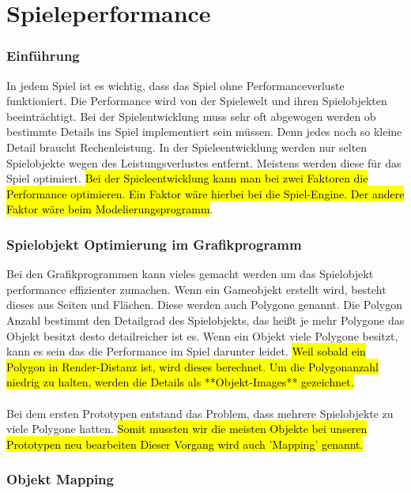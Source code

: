 
\pagebreak
{}
\chapter{Spieleperformance}


\subsection{Einführung}
In jedem Spiel ist es wichtig, dass das Spiel ohne Performanceverluste funktioniert. Die Performance wird von der Spielewelt und ihren Spielobjekten beeinträchtigt. Bei der Spielentwicklung muss sehr oft abgewogen werden ob bestimmte Details ins Spiel implementiert sein müssen. Denn jedes noch so kleine Detail braucht Rechenleistung. In der Spieleentwicklung werden nur selten Spielobjekte wegen des Leistungsverlustes entfernt. Meistens werden diese für das Spiel optimiert. \hl{Bei der Spieleentwicklung kann man bei zwei Faktoren die Performance optimieren. Ein Faktor wäre hierbei bei die Spiel-Engine. Der andere Faktor wäre beim Modelierungsprogramm}. %

\subsection{Spielobjekt Optimierung im Grafikprogramm}
Bei den Grafikprogrammen kann vieles gemacht werden um das Spielobjekt performance effizienter zumachen. Wenn ein Gameobjekt erstellt wird, besteht dieses aus Seiten und Flächen. Diese werden auch Polygone genannt. Die Polygon Anzahl bestimmt den Detailgrad des Spielobjekts, das heißt je mehr Polygone das Objekt besitzt desto detailreicher ist es. Wenn ein Objekt viele Polygone besitzt, kann es sein das die Performance im Spiel darunter leidet. \hl{Weil sobald ein Polygon in Render-Distanz ist, wird dieses berechnet. Um die Polygonanzahl niedrig zu halten, werden die Details als **Objekt-Images** gezeichnet.} \\\\ %
Bei dem ersten Prototypen entstand das Problem, dass mehrere Spielobjekte zu viele Polygone hatten. \hl{Somit mussten wir die meisten Objekte bei unseren Prototypen neu bearbeiten Dieser Vorgang wird auch 'Mapping' genannt.} %
\pagebreak
\subsection{Objekt Mapping}

